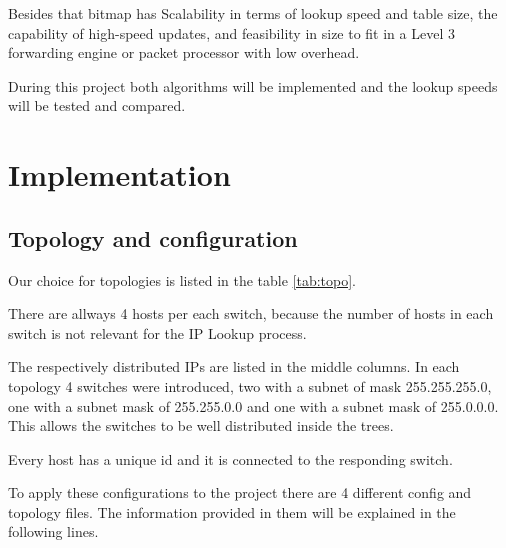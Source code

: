 \documentclass[]{report}
\begin{document}
Besides that bitmap has Scalability in terms of lookup speed and table size, the capability of high-speed updates, and feasibility in size to fit in a Level 3 forwarding engine or packet processor with low overhead.

During this project both algorithms will be implemented and the lookup speeds will be tested and compared.


\chapter{Implementation}
\section{Topology and configuration }
Our choice for topologies is listed in the table \ref{tab:topo}. 

\begin{minipage}{\linewidth}%
\label{tab:topo}
\end{minipage}

	There are allways 4 hosts per each switch, because the number of hosts in each switch is not relevant for the IP Lookup process.
	
The respectively distributed IPs are listed in the middle columns. In each topology 4 switches were introduced, two with a subnet of mask 255.255.255.0, one with a subnet mask of 255.255.0.0 and one with a subnet mask of 255.0.0.0. This allows the switches to be well distributed inside the trees.

Every host has a unique id and it is connected to the responding switch.
  
To apply these configurations to the project there are 4 different config and topology files. The information provided in them will be explained in the following lines.
\end{document}
